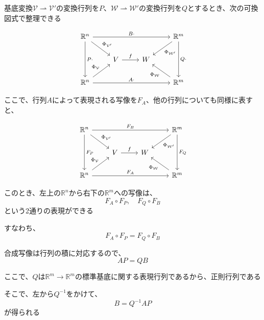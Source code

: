 \documentclass[../../../topic_linear-algebra]{subfiles}
\begin{document}
基底変換$\mathcal{V} \rightharpoonup \mathcal{V}'$の変換行列を$P$、$\mathcal{W} \rightharpoonup \mathcal{W}'$の変換行列を$Q$とするとき、次の可換図式で整理できる

\begin{equation*}
  \begin{tikzcd}
    \mathbb{R}^n \arrow[dd,"P\cdot"] \arrow[rd,"{\Phi_{\mathcal{V}'}}"] \arrow[rrr,"B\cdot"] &&& \mathbb{R}^m \arrow[dd,"Q\cdot"] \arrow[ld,"{\Phi_{\mathcal{W}'}}"] \\
    & V \arrow[r,"f"] & W & \\
    \mathbb{R}^n \arrow[ru,"{\Phi_{\mathcal{V}}}"] \arrow[rrr,"A\cdot"] &&& \mathbb{R}^m \arrow[lu,"{\Phi_{\mathcal{W}}}"]
  \end{tikzcd}
\end{equation*}

ここで、行列$A$によって表現される写像を$F_A$、他の行列についても同様に表すと、

\begin{equation*}
  \begin{tikzcd}
    \mathbb{R}^n \arrow[dd,"F_P"] \arrow[rd,"{\Phi_{\mathcal{V}'}}"] \arrow[rrr,"F_B"] &&& \mathbb{R}^m \arrow[dd,"F_Q"] \arrow[ld,"{\Phi_{\mathcal{W}'}}"] \\
    & V \arrow[r,"f"] & W & \\
    \mathbb{R}^n \arrow[ru,"{\Phi_{\mathcal{V}}}"] \arrow[rrr,"F_A"] &&& \mathbb{R}^m \arrow[lu,"{\Phi_{\mathcal{W}}}"]
  \end{tikzcd}
\end{equation*}

このとき、左上の$\mathbb{R}^n$から右下の$\mathbb{R}^m$への写像は、
\begin{equation*}
  F_A \circ F_P,\quad F_Q \circ F_B
\end{equation*}
という2通りの表現ができる

すなわち、
\begin{equation*}
  F_A \circ F_P = F_Q \circ F_B
\end{equation*}

合成写像は行列の積に対応するので、
\begin{equation*}
  AP = QB
\end{equation*}

ここで、$Q$は$\mathbb{R}^m \to \mathbb{R}^m$の標準基底に関する表現行列であるから、正則行列である

そこで、左から$Q^{-1}$をかけて、
\begin{equation*}
  B = Q^{-1} AP
\end{equation*}
が得られる
\end{document}
